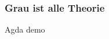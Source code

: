\documentclass[t,fleqn]{beamer}
\begin{document}





\begin{frame}%
  \frametitle{Grau ist alle Theorie}
\vfill
\begin{center}
  \huge Agda demo
\end{center}
\vfill
\end{frame}
\end{document}

